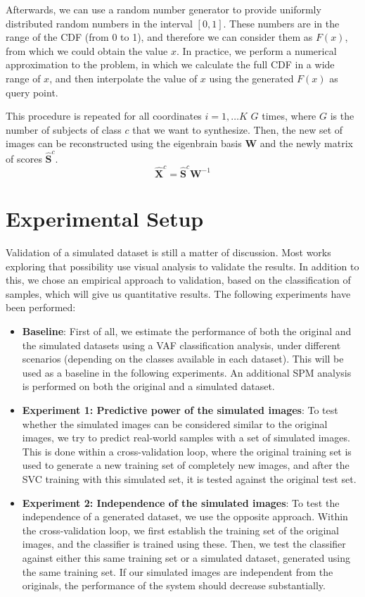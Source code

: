 Afterwards, we can use a random number generator to provide uniformly distributed random numbers in the interval $[0,1]$. These numbers are in the range of the \ac{CDF} (from 0 to 1), and therefore we can consider them as $F(x)$, from which we could obtain the value $x$. In practice, we perform a numerical approximation to the problem, in which we calculate the full \ac{CDF} in a wide range of $x$, and then interpolate the value of $x$ using the generated $F(x)$ as query point. 

This procedure is repeated for all coordinates $i=1,\dots K$ $G$ times, where $G$ is the number of subjects of class $c$ that we want to synthesize. Then, the new set of images can be reconstructed using the eigenbrain basis $\mathbf{W}$ and the newly matrix of scores $\widehat{\mathbf{S}}^c$. 
\begin{equation}
\widehat{\mathbf{X}}^c =\widehat{\mathbf{S}}^c\mathbf{W}^{-1} 
\end{equation}

\section{Experimental Setup}
Validation of a simulated dataset is still a matter of discussion. Most works exploring that possibility \cite{Ma1993,KwanEvansPike1999} use visual analysis to validate the results. In addition to this, we chose an empirical approach to validation, based on the classification of samples, which will give us quantitative results. The following experiments have been performed: 

\begin{itemize}
	\item \textbf{Baseline}: First of all, we estimate the performance of both the original and the simulated datasets using a \ac{VAF} \cite{Stoeckel04} classification analysis, under different scenarios (depending on the classes available in each dataset). This will be used as a baseline in the following experiments. An additional \ac{SPM} \cite{spm_book} analysis is performed on both the original and a simulated dataset. 
	\item \textbf{Experiment 1: Predictive power of the simulated images}: To test whe\-ther the simulated images can be considered similar to the original images, we try to predict real-world samples with a set of simulated images. This is done within a cross-validation loop, where the original training set is used to generate a new training set of completely new images, and after the \ac{SVC} training with this simulated set, it is tested against the original test set.  
	\item \textbf{Experiment 2: Independence of the simulated images}: To test the independence of a generated dataset, we use the opposite approach. Within the cross-validation loop, we first establish the training set of the original images, and the classifier is trained using these. Then, we test the classifier against either this same training set or a simulated dataset, generated using the same training set. If our simulated images are independent from the originals, the performance of the system should decrease substantially. 
\end{itemize}

